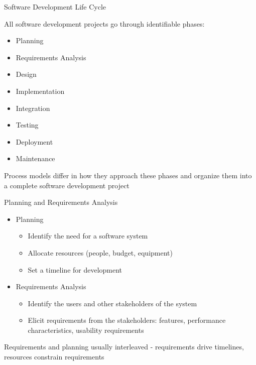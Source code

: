 \documentclass{beamer}
\begin{document}
\begin{frame}[fragile]{Software Development Life Cycle}


All software development projects go through identifiable phases:
\begin{itemize}
\item Planning
\item Requirements Analysis
\item Design
\item Implementation
\item Integration
\item Testing
\item Deployment
\item Maintenance
\end{itemize}
Process models differ in how they approach these phases and organize them into a complete software development project

\end{frame}

\begin{frame}[fragile]{Planning and Requirements Analysis}


\begin{itemize}
\item Planning
\begin{itemize}
\item Identify the need for a software system
\item Allocate resources (people, budget, equipment)
\item Set a timeline for development
\end{itemize}
\item Requirements Analysis
\begin{itemize}
\item Identify the users and other stakeholders of the system
\item Elicit requirements from the stakeholders: features, performance characteristics, usability requirements
\end{itemize}
\end{itemize}
Requirements and planning usually interleaved - requirements drive timelines, resources constrain requirements

\end{frame}
\end{document}
